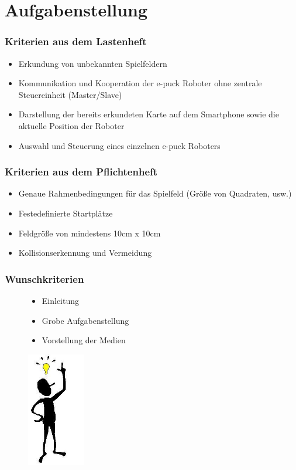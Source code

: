 \documentclass{beamer}
\begin{document}
\section{Aufgabenstellung}

\begin{frame}
  \frametitle{Kriterien aus dem Lastenheft}
  
	\begin{itemize}
		\item Erkundung von unbekannten Spielfeldern
		\item Kommunikation und Kooperation der e-puck Roboter ohne zentrale Steuereinheit 				(Master/Slave)
		\item Darstellung der bereits erkundeten Karte auf dem Smartphone sowie die 					aktuelle Position der Roboter
		\item Auswahl und Steuerung eines einzelnen e-puck Roboters
	\end{itemize}  
\end{frame}

\begin{frame}
  \frametitle{Kriterien aus dem Pflichtenheft}
  
  	\begin{itemize}
		\item Genaue Rahmenbedingungen für das Spielfeld (Größe von Quadraten, usw.)
		\item Festedefinierte Startplätze
		\item Feldgröße von mindestens 10cm x 10cm
		\item Kollisionserkennung und Vermeidung
	\end{itemize}  
\end{frame}

\begin{frame}
  \frametitle{Wunschkriterien}
  	
  	\begin{figure}[htbp]
	\begin{minipage}[t]{4cm}
		\vspace{30pt}
		\begin{itemize}
			\item Einleitung
			\item Grobe Aufgabenstellung
			\item Vorstellung der Medien
		\end{itemize}
	\end{minipage}
	\hfill
	\begin{minipage}[t]{0.5\textwidth}
		\vspace{0pt}
		\includegraphics[height=5cm]{idee.jpg} 
	\end{minipage}
   \end{figure} 
\end{frame}
\end{document}
